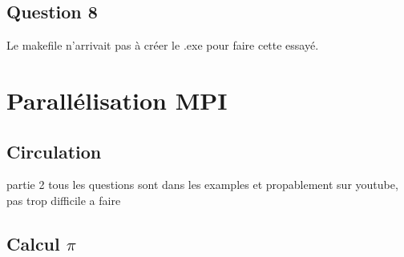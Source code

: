 \documentclass{article}
\begin{document}
\newpage\subsection*{Question 8}
\begin{resolution}
    Le makefile n'arrivait pas à créer le .exe pour faire cette essayé.
\end{resolution}


\section{Parallélisation MPI}
\subsection{Circulation}

partie 2
tous les questions sont dans les examples et propablement sur youtube, pas trop difficile a faire
\begin{scriptsize}
    \mycode
\end{scriptsize}



\newpage\subsection{Calcul $\pi$}
\end{document}
